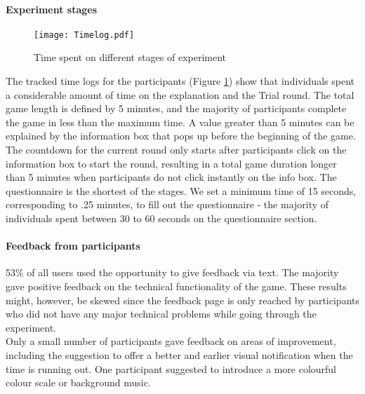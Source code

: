 \paragraph{Experiment stages}
 \begin{figure}[htbp] %
\begin{center} %
  \texttt{[image: Timelog.pdf]}
  \caption[Time spent on different stages of experiment]{Time spent on different stages of experiment\footnotemark}
  \label{Time spent on different stages of experiment}
\end{center}
\end{figure}

The tracked time logs for the participants  (Figure \ref{Time spent on different stages of experiment}) show that individuals spent a considerable amount of time on the explanation and the Trial round. The total game length is defined by 5 minutes, and the majority of participants complete the game in less than the maximum time. A value greater than 5 minutes can be explained by the information box that pops up before the beginning of the game. The countdown for the current round only starts after participants click on the information box to start the round, resulting in a total game duration longer than 5 minutes when participants do not click instantly on the info box.
The questionnaire is the shortest of the stages. We set a minimum time of 15 seconds, corresponding to .25 minutes, to fill out the questionnaire - the majority of individuals spent between 30 to 60 seconds on the questionnaire section.

\paragraph{Feedback from participants}
53\% of all users used the opportunity to give feedback via text. The majority gave positive feedback on the technical functionality of the game. These results might, however, be skewed since the feedback page is only reached by participants who did not have any major technical problems while going through the experiment. \\
Only a small number of participants gave feedback on areas of improvement, including the suggestion to offer a better and earlier visual notification when the time is running out. One participant suggested to introduce a more colourful colour scale or background music.


